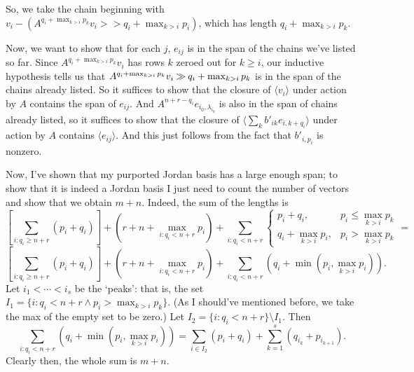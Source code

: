 \documentclass[12pt,psamsfonts]{article}
\newcommand{\rightshift}{\mathbin{\rotatebox[origin=c]{180}{$\ll$}}}
\begin{document}
So, we take the chain beginning with \(v_i - (A^{q_i + \max_{k > i} p_k} v_i >> q_i + \max_{k > i} p_i)\), which has length \(q_i + \max_{k > i} p_k\).
\par Now, we want to show that for each \(j\), \(e_{ij}\) is in the span of the chains we've listed so far.
Since \(A^{q_i + \max_{k > i} p_k} v_i\) has rows \(k\) zeroed out for \(k \geq i\), our inductive hypothesis tells us that \(A^{q_i + \max_{k > i} p_k} v_i \rightshift q_i + \max_{k > i} p_k\) is in the span of the chains already listed.
So it suffices to show that the closure of \(\langle v_i \rangle\) under action by \(A\) contains the span of \(e_{ij}\).
And \(A^{n + r - q_i} e_{i_0, \lambda_{i_0}}\) is also in the span of chains already listed, so it suffices to show that the closure of \(\langle \sum_k b'_{ik} e_{i,k + q_i}\rangle \) under action by \(A\) contains \(\langle e_{ij}\rangle\).
And this just follows from the fact that \(b'_{i,p_i}\) is nonzero.
\par Now, I've shown that my purported Jordan basis has a large enough span; to show that it is indeed a Jordan basis I just need to count the number of vectors and show that we obtain \(m + n\).
Indeed, the sum of the lengths is
\[\left[\sum_{i : q_i \geq n + r} (p_i + q_i)\right] + (r + n + \max_{i : q_i < n + r} p_i) + \sum_{i : q_i < n + r} \begin{cases}
    p_i + q_i, & p_i \leq \max_{k > i} p_k \\
    q_i + \max_{k > i} p_i, & p_i > \max_{k > i} p_k
\end{cases} = \]
\[\left[\sum_{i : q_i \geq n + r} (p_i + q_i)\right] + (r + n + \max_{i : q_i < n + r} p_i) + \sum_{i : q_i < n + r} (q_i + \min(p_i, \max_{k > i} p_i)).\]
Let \(i_1 < \cdots < i_s\) be the `peaks': that is, the set \(I_1 = \{i : q_i < n + r \land p_i > \max_{k > i} p_k\}\).
(As I should've mentioned before, we take the max of the empty set to be zero.)
Let \(I_2 = \{i : q_i < n + r\} \setminus I_1\).
Then 
\[\sum_{i : q_i < n + r} (q_i + \min(p_i, \max_{k > i} p_i)) = \sum_{i \in I_2} (p_i + q_i) + \sum_{k = 1}^s (q_{i_k} + p_{i_{k + 1}}).\]
Clearly then, the whole sum is \(m + n\).
\end{document}
